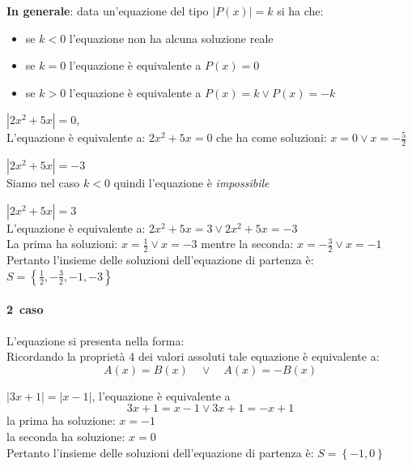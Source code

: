 \noindent \textbf{In generale}: data un'equazione del tipo \(|P(x)|=k\) si ha che:
\begin{itemize}[nosep]
 \item se \(k < 0\)  l'equazione non ha alcuna soluzione reale
 \item se \(k = 0\)  l'equazione è equivalente a  \(P(x) = 0\)
 \item se \(k > 0\)   l'equazione è equivalente a  \(P(x)=k \vee P(x)=-k\)
\end{itemize}

\begin{esempio} 
\(|2x^2+5x|=0,\) \\[4pt]
L'equazione è equivalente a: \(2x^2+5x=0\)
che ha come soluzioni:
\(x=0 \vee x=-\frac{5}{2}\)
\end{esempio}

\begin{esempio} 
\(|2x^2+5x|=-3\)\\[4pt] Siamo nel caso \(k < 0\) 
quindi l'equazione è \emph{impossibile}
\end{esempio}
        
\begin{esempio} 
\(|2x^2+5x|=3\)\\[4pt] L'equazione è equivalente a:
\(2x^2+5x=3 \vee 2x^2+5x=-3\) \\[4pt]
La prima ha soluzioni: \(x=\frac{1}{2} \vee x=-3\) mentre la seconda: \(x=-\frac{3}{2} \vee x=-1\)\\[4pt]
Pertanto l'insieme delle soluzioni dell'equazione di partenza è: 
\(S=\left\lbrace \frac{1}{2},-\frac{3}{2},-1,-3\right\rbrace \)
\end{esempio}

\paragraph{2\textdegree~caso} L'equazione si presenta nella forma:  
\\[4pt]
Ricordando la proprietà 4 dei valori assoluti tale equazione è equivalente a:
\[A(x)=B(x) \quad\vee\quad  A(x)=-B(x)\]

\begin{esempio} \(|3x+1|=|x-1|\), l'equazione è equivalente a
\[3x+1=x-1 \vee 3x+1=-x+1\]
la prima ha soluzione: \(x=-1\)\\
la seconda ha soluzione: \(x=0\)\\
Pertanto l'insieme delle soluzioni dell'equazione di partenza è: 
\(S=\left\lbrace -1,0 \right\rbrace \) 
\end{esempio}
                
